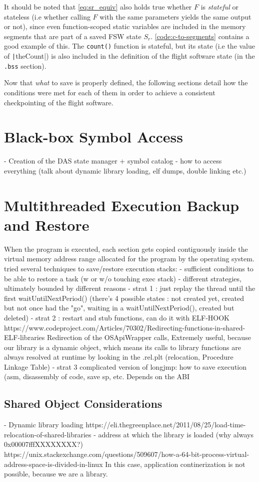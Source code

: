 {It should be noted that \autoref{eq:sr_equiv} also holds true whether $F$ is \textit{stateful} or stateless (i.e whether calling $F$ with the same parameters yields the same output or not), since even function-scoped static variables are included in the memory segments that are part of a saved FSW state $S_r$. \autoref{code:c-to-segments} contains a good example of this. The \texttt{count()} function is stateful, but its state (i.e the value of \texttt|theCount|) is also included in the definition of the flight software state (in the \texttt{.bss} section).

Now that \textit{what} to save is properly defined, the following sections detail how the conditions were met for each of them in order to achieve a consistent checkpointing of the flight software.

\section{Black-box Symbol Access}\label{sec:das-mem-restore}
- Creation of the DAS state manager + symbol catalog
- how to access everything (talk about dynamic library loading, elf dumps, double linking etc.)
\section{Multithreaded Execution Backup and Restore}\label{sec:das-exec-restore}
When the program is executed, each section gets copied contiguously inside the virtual memory address range allocated for the program by the operating system. 
tried several techniques to save/restore execution stacks:
- sufficient conditions to be able to restore a task (w or w/o touching exec stack)
- different strategies, ultimately bounded by different reasons 
- strat 1 : just replay the thread until the first waitUntilNextPeriod() (there's 4 possible states : not created yet, created but not once had the "go", waiting in a waitUntilNextPeriod(), created but deleted)
- strat 2 : restart and stub functions, can do it with ELF-HOOK https://www.codeproject.com/Articles/70302/Redirecting-functions-in-shared-ELF-libraries
	Redirection of the OSApiWrapper calls, Extremely useful, because our library is a dynamic object, which means its calls to library functions are always resolved at runtime by looking in the .rel.plt (relocation, Procedure Linkage Table)
- strat 3 complicated version of longjmp: how to save execution (asm, disassembly of code, save sp, etc.%
Depends on the ABI

\subsection*{Shared Object Considerations}\label{sec:dynlib-considerations}
- Dynamic library loading  https://eli.thegreenplace.net/2011/08/25/load-time-relocation-of-shared-libraries
- address at which the library is loaded (why always 0x00007fffXXXXXXXX?) https://unix.stackexchange.com/questions/509607/how-a-64-bit-process-virtual-address-space-is-divided-in-linux
In this case, application continerization is not possible, because we are a library.

}